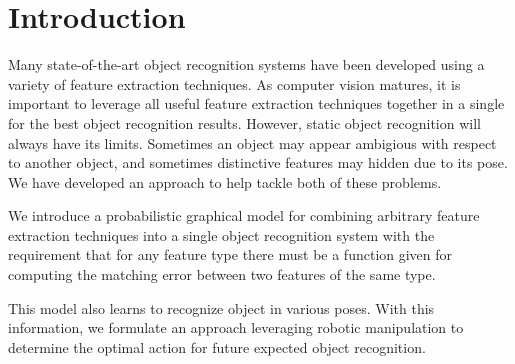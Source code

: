 \documentclass[conference]{IEEEtran}
\newcommand{\figref}[1]{Fig.~\ref{#1}}
\begin{document}
\IEEEpeerreviewmaketitle

\section{Introduction}


    Many state-of-the-art object recognition systems have been developed using a variety of feature extraction techniques. As computer vision matures, it is important to leverage all useful feature extraction techniques together in a single for the best object recognition results. However, static object recognition will always have its limits. Sometimes an object may appear ambigious with respect to another object, and sometimes distinctive features may hidden due to its pose.  We have developed an approach to help tackle both of these problems.

    We introduce a probabilistic graphical model for combining arbitrary feature extraction techniques into a single object recognition system with the requirement that for any feature type there must be a function given for computing the matching error between two features of the same type. 

    This model also learns to recognize object in various poses. With this information, we formulate an approach leveraging robotic manipulation to determine the optimal action for future expected object recognition.  


\end{document}
